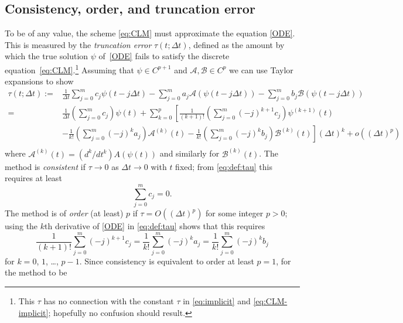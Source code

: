 \documentclass[12pt]{article}
\newcommand{\dt}{\Delta t}
\newcommand{\opA}{\mathcal{A}}
\newcommand{\opB}{\mathcal{B}}
\begin{document}
\pagebreak[3]
\subsection{Consistency, order, and truncation error\label{sec:terr}}

To be of any value, the scheme \eqref{eq:CLM} must approximate the equation
\eqref{ODE}.  This is measured by the \emph{truncation error} $\tau(t;\dt)$,
defined as the amount by which the true solution $\psi$ of~\eqref{ODE} fails
to satisfy the discrete equation~\eqref{eq:CLM}.\footnote{This $\tau$ has no
connection with the constant $\tau$ in \eqref{eq:implicit} and
\eqref{eq:CLM-implicit}; hopefully no confusion should result.}
Assuming that $\psi\in C^{p+1}$ and $\opA,\opB\in C^p$ we can use Taylor
expansions to show
\begin{align}
   \tau(t;\dt) :=&
   \frac{1}{\dt} \sum_{j=0}^{m} c_j \psi(t-j\dt)
   - \sum_{j=0}^{m} a_j \opA\left(\psi(t-j\dt)\right)
   - \sum_{j=0}^{m} b_j \opB\left(\psi(t-j\dt)\right) 
\nonumber \\
   =& \frac{1}{\dt} \left(\sum_{j=0}^{m} c_j\right) \psi(t)
    +  \sum_{k=0}^p \left[\frac{1}{(k+1)!}
       \left(\sum_{j=0}^{m} (-j)^{k+1} c_j\right) \psi^{(k+1)}(t)\right. 
\nonumber \\
   &-  \left.\frac{1}{k!}
        \left(\sum_{j=0}^{m} (-j)^{k} a_j\right) \opA^{(k)}(t) 
    - \frac{1}{k!}
      \left(\sum_{j=0}^{m} (-j)^{k} b_j\right) \opB^{(k)}(t)\right](\dt)^{k} 
    + o\left((\dt)^{p}\right)
\nonumber \\
\label{eq:def:tau}
\end{align}
where $\opA^{(k)}(t) = (d^k/dt^k)A(\psi(t))$ and similarly for
$\opB^{(k)}(t)$.  The method is \emph{consistent} if $\tau\to0$ as $\dt\to0$
with $t$ fixed; from \eqref{eq:def:tau} this requires at least
\begin{equation}
  \sum_{j=0}^{m} c_j = 0 .
\label{eq:consistency1}
\end{equation}
The method is of \emph{order} (at least) $p$ if $\tau=O\left((\dt)^p\right)$ 
for some integer $p>0$; using the $k$th derivative of \eqref{ODE} in 
\eqref{eq:def:tau} shows that this requires
\begin{equation}
  \frac{1}{(k+1)!} \sum_{j=0}^{m} (-j)^{k+1} c_j
    = \frac{1}{k!} \sum_{j=0}^{m} (-j)^{k} a_j 
    = \frac{1}{k!} \sum_{j=0}^{m} (-j)^{k} b_j 
\label{eq:order}
\end{equation}
for $k=0$, $1$, \dots, $p-1$.  
Since consistency is equivalent to order at least $p=1$, for the method to be
\end{document}
